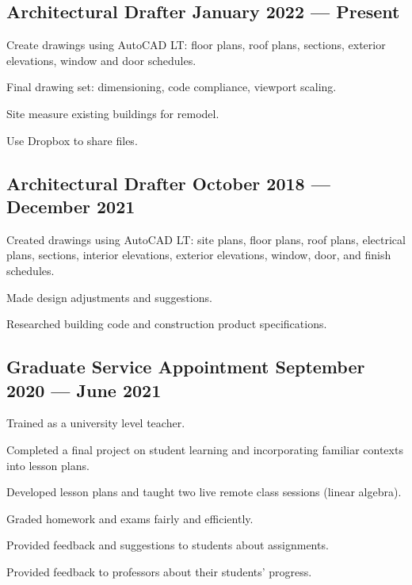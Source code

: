 \documentclass[letter,10pt]{article}
\begin{document}
\subsection{{Architectural Drafter \hfill January 2022 --- Present}}
\begin{zitemize}
    \item Create drawings using AutoCAD LT: floor plans, roof plans, sections, exterior elevations, window and door schedules.
    \item Final drawing set: dimensioning, code compliance, viewport scaling.
    \item Site measure existing buildings for remodel.
    \item Use Dropbox to share files.
\end{zitemize}

\subsection{{Architectural Drafter \hfill October 2018 --- December 2021}}
\begin{zitemize}
    \item  Created drawings using AutoCAD LT: site plans, floor plans, roof plans, electrical plans, sections, interior elevations, exterior elevations, window, door, and finish schedules.
    \item Made design adjustments and suggestions.
    \item Researched building code and construction product specifications.
\end{zitemize}

\subsection{{Graduate Service Appointment \hfill September 2020 --- June 2021}}
\begin{zitemize}
    \item Trained as a university level teacher.
    \item Completed a final project on student learning and incorporating familiar contexts into lesson plans.
    \item Developed lesson plans and taught two live remote class sessions (linear algebra).
    \item Graded homework and exams fairly and efficiently.
    \item Provided feedback and suggestions to students about assignments.
    \item Provided feedback to professors about their students' progress.
\end{zitemize}
\end{document}
